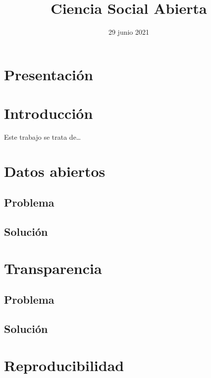 \documentclass[
]{book}
\title{Ciencia Social Abierta}
\author{}
\date{\vspace{-2.5em}29 junio 2021}
\begin{document}
\maketitle

{
\setcounter{tocdepth}{1}
\tableofcontents
}
\hypertarget{presentaciuxf3n}{%
\chapter*{Presentación}\label{presentaciuxf3n}}

\hypertarget{introducciuxf3n}{%
\chapter{Introducción}\label{introducciuxf3n}}

Este trabajo se trata de\ldots{}

\hypertarget{datos-abiertos}{%
\chapter{Datos abiertos}\label{datos-abiertos}}

\hypertarget{problema}{%
\section{Problema}\label{problema}}

\hypertarget{soluciuxf3n}{%
\section{Solución}\label{soluciuxf3n}}

\hypertarget{transparencia}{%
\chapter{Transparencia}\label{transparencia}}

\hypertarget{problema-1}{%
\section{Problema}\label{problema-1}}

\hypertarget{soluciuxf3n-1}{%
\section{Solución}\label{soluciuxf3n-1}}

\hypertarget{reproducibilidad}{%
\chapter{Reproducibilidad}\label{reproducibilidad}}
\end{document}
